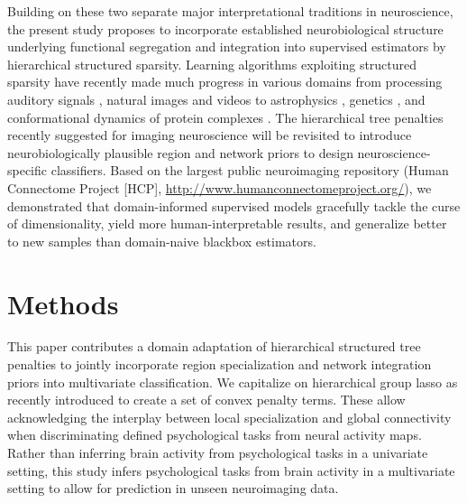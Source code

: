\documentclass{article}
\begin{document}
Building on these two
separate major interpretational traditions in neuroscience,
the present study proposes to incorporate
established neurobiological structure underlying
functional segregation and integration
into supervised estimators
by hierarchical structured sparsity.
%
Learning algorithms
exploiting structured sparsity 
have recently made much progress in various domains
from processing auditory signals \cite{daudet2004sparse},
natural images \cite{harzallah2009combining} and
videos \cite{kang2015structured}
to
astrophysics \cite{vinci2014estimating},
genetics \cite{kim2012tree},
and
conformational dynamics of protein complexes \cite{jenatton2009structured}.
%
The hierarchical tree penalties recently suggested for imaging neuroscience
\cite{jenatton2012multi} will be revisited to
introduce neurobiologically plausible region and network priors
to design neuroscience-specific classifiers.
%
Based on the largest public neuroimaging repository
(Human Connectome Project [HCP], \url{http://www.humanconnectomeproject.org/}),
we demonstrated that domain-informed supervised models
gracefully tackle the curse of dimensionality,
yield more human-interpretable results,
and generalize better to new samples
than domain-naive blackbox estimators.

\section{Methods}
This paper contributes a domain adaptation of hierarchical structured
tree penalties to jointly incorporate region 
specialization and network integration priors into multivariate 
classification.
We capitalize on hierarchical group lasso as recently introduced
\cite{jenatton2012multi} to create a set of convex penalty terms.
These allow acknowledging the interplay between local specialization and 
global connectivity when discriminating defined psychological tasks
from neural activity maps.
Rather than inferring brain activity from psychological tasks
in a univariate setting,
this study infers psychological tasks from brain activity
in a multivariate setting to allow for
prediction in unseen neuroimaging data.
%
\end{document}
